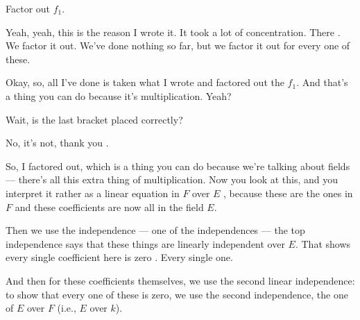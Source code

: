 \begin{proofWrapper}
\begin{hidden}
\end{hidden}

\begin{student}
Factor out $f_1$.
\end{student}

\begin{speech}[00:36:18 - 00:36:44]
Yeah, yeah, this is the reason I wrote it. It took a lot of concentration. There . We factor it out. We've done nothing so far, but we factor it out for every one of these.

Okay, so, all I've done is taken what I wrote and factored out the $f_1$. And that's a thing you can do because it's multiplication. Yeah?
\end{speech}

\begin{student}
Wait, is the last bracket placed correctly?
\end{student}

\begin{speech}[00:36:46 - 00:37:58]
No, it's not, thank you .

So, I factored out, which is a thing you can do because we're talking about fields --- there's all this extra thing of multiplication. Now you look at this, and you interpret it rather as a linear equation in $F$ over $E$ , because these are the ones in $F$ and these coefficients are now all in the field $E$.

Then we use the independence --- one of the independences --- the top independence says that these things are linearly independent over $E$. That shows every single coefficient here is zero . Every single one.

And then for these coefficients themselves, we use the second linear independence: to show that every one of these is zero, we use the second independence, the one of $E$ over $F$ (i.e., $E$ over $k$).


\end{speech}
\end{proofWrapper}
